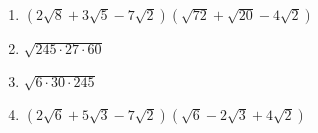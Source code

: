 \begin{enumerate}[label=\asbuk*)]
	\item $(2\sqrt{8}+3\sqrt{5}-7\sqrt{2})(\sqrt{72}+\sqrt{20}-4\sqrt{2})$
	\item  $\sqrt{245 \cdot 27 \cdot 60}$
	\item $\sqrt{6 \cdot 30 \cdot 245}$
	\item $(2\sqrt{6}+5\sqrt{3}-7\sqrt{2})(\sqrt{6}-2\sqrt{3}+4\sqrt{2})$
\end{enumerate}
